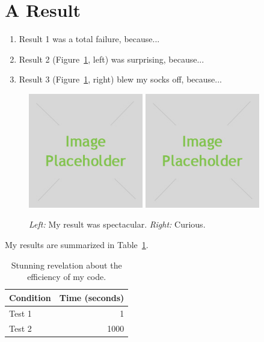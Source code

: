 \section*{A Result}

\begin{enumerate}
    \item Result 1 was a total failure, because...
    \item Result 2 (Figure~\ref{fig:result1}, left) was surprising, because...
    \item Result 3 (Figure~\ref{fig:result1}, right) blew my socks off, because...
\end{enumerate}

\begin{figure}[h]
    \centering
    \includegraphics[width=5cm]{placeholder.jpg}
    \includegraphics[width=5cm]{placeholder.jpg}
    \caption{\emph{Left:} My result was spectacular. \emph{Right:} Curious.}
    \label{fig:result1}
\end{figure}

My results are summarized in Table~\ref{tab:table1}.

\begin{table}[h]
    \centering
    \begin{tabular}{lr}
        \toprule
        Condition & Time (seconds) \\
        \midrule
        Test 1 & 1 \\
        Test 2 & 1000 \\
        \bottomrule
    \end{tabular}
    \caption{Stunning revelation about the efficiency of my code.}
    \label{tab:table1}
\end{table}


